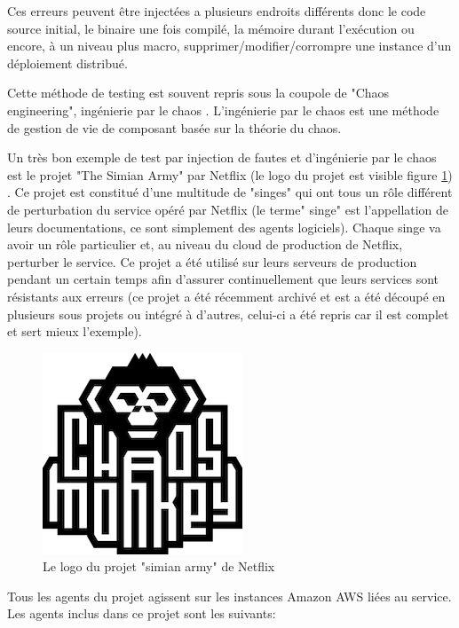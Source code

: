 \documentclass[a4paper]{report}
\begin{document}
Ces erreurs peuvent être injectées a plusieurs endroits différents donc le code source initial, le binaire une fois compilé, la mémoire durant l'exécution ou encore, à un niveau plus macro, supprimer/modifier/corrompre une instance d'un déploiement distribué\cite{Avresky1996}.

\iffalse
Cette méthode de testing est souvent repris sous la coupole de "Chaos engineering", ingénierie par le chaos \cite{Lenka2018}.
L'ingénierie par le chaos est une méthode de gestion de vie de composant basée sur la théorie du chaos.

Un très bon exemple de test par injection de fautes et d'ingénierie par le chaos est le projet "The Simian Army" par Netflix\cite{Lenka2018}\cite{netflix_blog_2018} (le logo du projet est visible figure \ref{fig:simian}) .
Ce projet est constitué d'une multitude de "singes" qui ont tous un rôle différent de perturbation du service opéré par Netflix (le terme" singe" est l'appellation de leurs documentations, ce sont simplement des agents logiciels).
Chaque singe va avoir un rôle particulier et, au niveau du cloud de production de Netflix, perturber le service.
Ce projet a été utilisé sur leurs serveurs de production\cite{Lenka2018} pendant un certain temps afin d'assurer continuellement que leurs services sont résistants aux erreurs (ce projet a été récemment archivé et est a été découpé en plusieurs sous projets ou intégré à d'autres, celui-ci a été repris car il est complet et sert mieux l'exemple\cite{githubGitHubNetflixchaosmonkey}).

\begin{figure}[ht]
	\begin{center}
		\includegraphics[scale=2]{img/chaosmonkey.png} 
	\end{center}
	\caption{Le logo du projet "simian army" de Netflix}
	\label{fig:simian}
\end{figure}

Tous les agents du projet agissent sur les instances Amazon AWS liées au service.
Les agents inclus dans ce projet sont les suivants:
\end{document}
